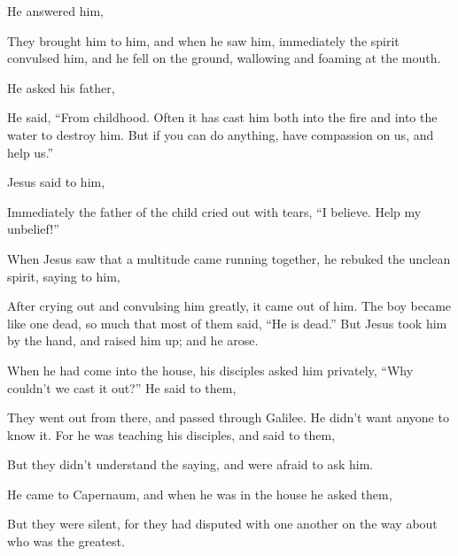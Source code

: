 {\par }{\PP {}He answered him,
{}
\par }{\PP {}They brought him to him, and when he saw him, immediately the spirit convulsed him, and he fell on the ground, wallowing and foaming at the mouth.
\par }{\PP {}He asked his father,
{}
\par }{\PP He said, “From childhood.
Often it has cast him both into the fire and into the water to destroy him. But if you can do anything, have compassion on us, and help us.”
\par }{\PP {}Jesus said to him,
{}
\par }{\PP {}Immediately the father of the child cried out with tears, “I believe. Help my unbelief!”
\par }{\PP {}When Jesus saw that a multitude came running together, he rebuked the unclean spirit, saying to him,
{}
\par }{\PP {}After crying out and convulsing him greatly, it came out of him. The boy became like one dead, so much that most of them said, “He is dead.”
But Jesus took him by the hand, and raised him up; and he arose.
\par }{\PP {}When he had come into the house, his disciples asked him privately, “Why couldn’t we cast it out?”
He said to them,
{}
\par }{\PP {}They went out from there, and passed through Galilee. He didn’t want anyone to know it.
For he was teaching his disciples, and said to them,
{}
\par }{\PP {}But they didn’t understand the saying, and were afraid to ask him.
\par }{\PP {}He came to Capernaum, and when he was in the house he asked them,
{}
\par }{\PP {}But they were silent, for they had disputed with one another on the way about who was the greatest.
}
